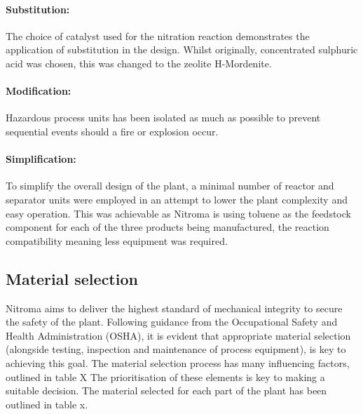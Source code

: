 \paragraph{Substitution:} The choice of catalyst used for the nitration reaction demonstrates the application of substitution in the design. Whilst originally, concentrated sulphuric acid was chosen, this was changed to the zeolite H-Mordenite. 

\paragraph{Modification:} Hazardous process units has been isolated as much as possible to prevent sequential events should a fire or explosion occur. 

\paragraph{Simplification:} To simplify the overall design of the plant, a minimal number of reactor and separator units were employed in an attempt to lower the plant complexity and easy operation. This was achievable as Nitroma is using toluene as the feedstock component for each of the three products being manufactured, the reaction compatibility meaning less equipment was required. 

\subsection{Material selection}

Nitroma aims to deliver the highest standard of mechanical integrity to secure the safety of the plant.  Following guidance from the Occupational Safety and Health Administration (OSHA), it is evident that appropriate material selection (alongside testing, inspection and maintenance of process equipment), is key to achieving this goal. The material selection process has many influencing factors, outlined in table X
The prioritisation of these elements is key to making a suitable decision. The material selected for each part of the plant has been outlined in table x.

